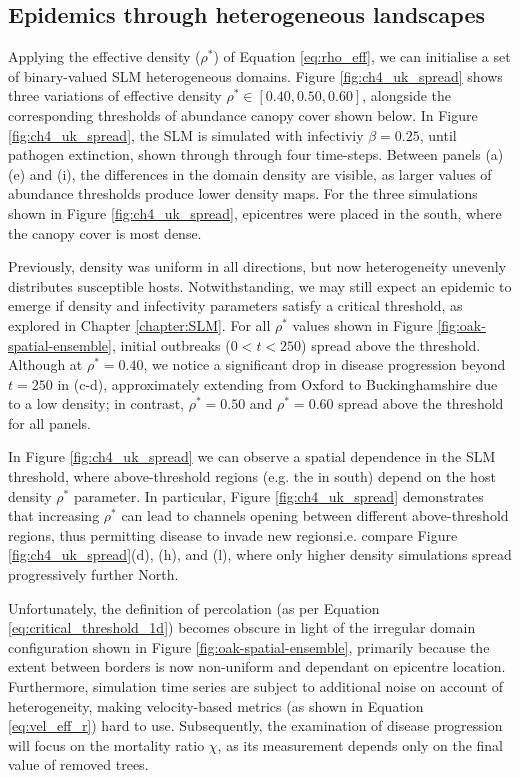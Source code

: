 \subsection{Epidemics through heterogeneous landscapes}

Applying the effective density ($\rho^{*}$) of Equation \ref{eq:rho_eff},
we can initialise a set of binary-valued SLM heterogeneous domains. 
Figure \ref{fig:ch4_uk_spread} shows three variations of effective density
$\rho^{*} \in [0.40, 0.50, 0.60]$, alongside the corresponding thresholds of
abundance canopy cover shown below. In Figure \ref{fig:ch4_uk_spread}, the SLM
is simulated with infectiviy $\beta=0.25$, until pathogen extinction, 
shown through through four time-steps. Between panels (a) (e) and (i), 
the differences in the domain density are visible,
as larger values of abundance thresholds produce lower density maps.
For the three simulations shown in Figure \ref{fig:ch4_uk_spread}, 
epicentres were placed in the south, where the canopy cover is most dense. 

Previously, density was uniform in all directions, 
but now heterogeneity unevenly distributes susceptible hosts. 
Notwithstanding, we may still expect an epidemic to emerge if density 
and infectivity parameters satisfy a critical threshold, as explored in Chapter \ref{chapter:SLM}.
For all $\rho^*$ values shown in Figure \ref{fig:oak-spatial-ensemble}, 
initial outbreaks ($0<t<250$) spread above the threshold.
Although at $\rho^*=0.40$, we notice a significant drop in disease progression 
beyond $t=250$ in (c-d), approximately extending from Oxford to Buckinghamshire due to a low density;
in contrast, $\rho^*=0.50$ and $\rho^*=0.60$ spread above the threshold for all panels.

In Figure \ref{fig:ch4_uk_spread} we can observe a spatial dependence in the SLM threshold,
where above-threshold regions (e.g. the in south) depend on the host density $\rho^*$ parameter.
In particular, Figure \ref{fig:ch4_uk_spread} demonstrates that increasing $\rho^*$ can lead to channels opening between different above-threshold regions, thus permitting disease to invade new regions\textemdash i.e. compare Figure \ref{fig:ch4_uk_spread}(d), (h), and (l), where only higher density simulations spread progressively further North.

Unfortunately, the definition of percolation (as per Equation \ref{eq:critical_threshold_1d}) becomes obscure in light of the irregular domain configuration shown in 
Figure \ref{fig:oak-spatial-ensemble}, primarily because the extent between borders is now non-uniform
and dependant on epicentre location.
Furthermore, simulation time series are subject to additional noise on account of heterogeneity, 
making velocity-based metrics (as shown in Equation \ref{eq:vel_eff_r}) hard to use. 
Subsequently, the examination of disease progression will focus on the mortality ratio $\chi$, 
as its measurement depends only on the final value of removed trees.

